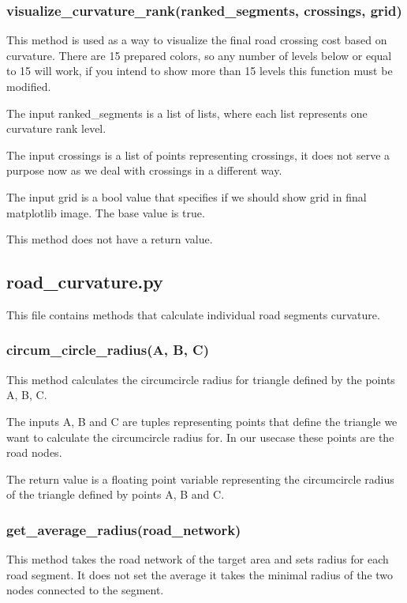 \documentclass[oneside]{article}
\begin{document}
            \subsubsection{visualize\_curvature\_rank(ranked\_segments, crossings, grid)}
            This method is used as a way to visualize the final road crossing cost based on curvature. There are 15 prepared colors, so any number of levels below or equal to 15 will work, if you intend to show more than 15 levels this function must be modified.

            The input ranked\_segments is a list of lists, where each list represents one curvature rank level.

            The input crossings is a list of points representing crossings, it does not serve a purpose now as we deal with crossings in a different way.

            The input grid is a bool value that specifies if we should show grid in final matplotlib image. The base value is true.

            This method does not have a return value.

        \subsection{road\_curvature.py}
        This file contains methods that calculate individual road segments curvature.

            \subsubsection{circum\_circle\_radius(A, B, C)}
            This method calculates the circumcircle radius for triangle defined by the points A, B, C.

            The inputs A, B and C are tuples representing points that define the triangle we want to calculate the circumcircle radius for. In our usecase these points are the road nodes.

            The return value is a floating point variable representing the circumcircle radius of the triangle defined by points A, B and C.

            \subsubsection{get\_average\_radius(road\_network)}
            \label{sec:dtype}
            This method takes the road network of the target area and sets radius for each road segment. It does not set the average it takes the minimal radius of the two nodes connected to the segment.
\end{document}
